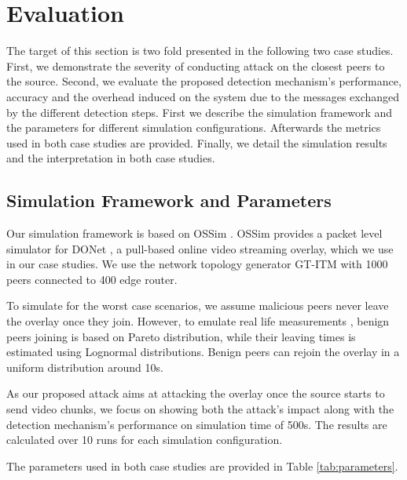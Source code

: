 \section{Evaluation}
\label{sec:eval}

The target of this section is two fold presented in the following two case studies.
First, we demonstrate the severity of conducting \drop attack on the closest peers to the source.
Second, we evaluate the proposed detection mechanism's performance, accuracy and the overhead induced on the system due to the messages exchanged by the different detection steps.
First we describe the simulation framework and the parameters for different simulation configurations. Afterwards the metrics used in both case studies are provided.
Finally, we detail the simulation results and the interpretation in both case studies.

\subsection{Simulation Framework and Parameters}
Our simulation framework is based on OSSim \cite{nguyen2013ossim}. 
OSSim provides a packet level simulator for DONet \cite{zhang2005coolstreaming}, a pull-based online video streaming overlay, which we use in our case studies.
We use the network topology generator GT-ITM \cite{GT} with 1000 peers connected to 400 edge router.

To simulate for the worst case scenarios, we assume malicious peers never leave the overlay once they join.
However, to emulate real life measurements \cite{distribution}, benign peers joining is based on Pareto distribution, while their leaving times is estimated using Lognormal distributions.
Benign peers can rejoin the overlay in a uniform distribution around 10s.

As our proposed attack aims at attacking the overlay once the source starts to send video chunks, we focus on showing both the attack's impact along with the detection mechanism's performance on simulation time of 500s.
The results are calculated over 10 runs for each simulation configuration.

The parameters used in both case studies are provided in Table \ref{tab:parameters}.

